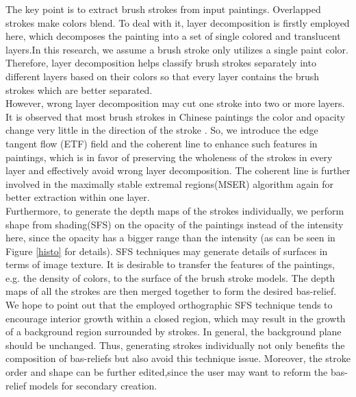 The key point is to extract brush strokes from input paintings. Overlapped strokes make colors blend. To deal with it, layer decomposition is firstly employed here, which decomposes the painting into a set of single colored and translucent layers.In this research, we assume a brush stroke only utilizes a single paint color. Therefore, layer decomposition helps classify brush strokes separately into different layers based on their colors so that every layer contains the brush strokes which are better separated.\\
However, wrong layer decomposition may cut one stroke into two or more layers. It is observed that most brush strokes in Chinese paintings the color and opacity change very little in the direction of the stroke \cite{xu2006animating}. So, we introduce the edge tangent flow (ETF) field and the coherent line \cite{kang2007coherent} to enhance such features in paintings, which is in favor of preserving the wholeness of the strokes in every layer and effectively avoid wrong layer decomposition.
\newline
The coherent line is further involved in the maximally stable extremal regions(MSER) algorithm \cite{donoser2006efficient} again for better extraction within one layer.\\
Furthermore, to generate the depth maps of the strokes individually, we perform shape from shading(SFS) on the opacity of the paintings instead of the intensity here, since the opacity has a bigger range than the intensity (as can be seen in Figure \ref{histo} for details). SFS techniques may generate details of surfaces in terms of image texture. It is desirable to transfer the features of the paintings, e.g. the density of colors, to the surface of the brush stroke models.
\newline
The depth maps of all the strokes are then merged together to form the desired bas-relief. We hope to point out that the employed orthographic SFS technique tends to encourage interior growth within a closed region, which may result in the growth of a background region surrounded by strokes. In general, the background plane should be unchanged. Thus, generating strokes individually not only benefits the composition of bas-reliefs but also avoid this technique issue.
Moreover, the stroke order and shape can be further edited,since the user may want to reform the bas-relief models for secondary creation.
\newpage 